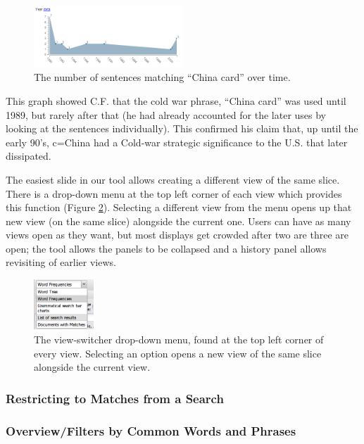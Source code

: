 \documentclass{sig-alternate}
\begin{document}
\begin{figure}[h!]
\includegraphics[width=0.5\textwidth]{fig/chris/02.png}
\caption{ The number of sentences matching ``China card'' over time. \label{fig:chris02}}
\end{figure}

This graph showed C.F. that the cold war phrase, ``China card'' was used until 1989, but rarely  after that (he had already accounted for the later uses by looking at the sentences individually). This confirmed his claim that, up until the early 90's, c=China had a Cold-war strategic significance to the U.S. that later dissipated.

The easiest slide in our tool allows creating a different view of the same slice.  There is a drop-down menu at the top left corner of each view which provides this function (Figure \ref{fig:chris03}).  Selecting a different view from the menu opens up that new view (on the same slice) alongside the current one. Users can have as many views open as they want, but most displays get crowded after two are three are open; the tool allows the panels to be collapsed and a history panel allows revisiting of earlier views.  
\begin{figure}[h!]
\includegraphics[width=0.2\textwidth]{fig/chris/03.png}
\caption{ The view-switcher drop-down menu, found at the top left corner of every view. Selecting an option opens a new view  of the same slice alongside the current view. \label{fig:chris03}}
\end{figure}

\subsubsection{Restricting to Matches from a Search}


\subsubsection{Overview/Filters by Common Words and Phrases }
\end{document}
